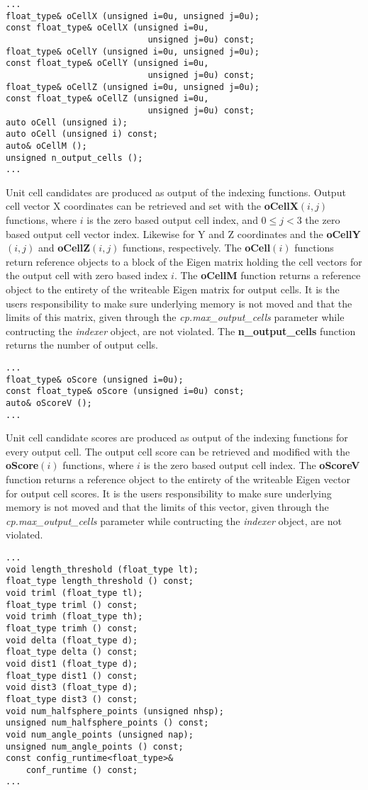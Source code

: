 \documentclass[a4paper,10pt]{article}
\begin{document}
%
\begin{lstlisting}
...
float_type& oCellX (unsigned i=0u, unsigned j=0u);
const float_type& oCellX (unsigned i=0u,
                            unsigned j=0u) const;
float_type& oCellY (unsigned i=0u, unsigned j=0u);
const float_type& oCellY (unsigned i=0u,
                            unsigned j=0u) const;
float_type& oCellZ (unsigned i=0u, unsigned j=0u);
const float_type& oCellZ (unsigned i=0u,
                            unsigned j=0u) const;
auto oCell (unsigned i);
auto oCell (unsigned i) const;
auto& oCellM ();
unsigned n_output_cells ();
...
\end{lstlisting}
%
Unit cell candidates are produced as output of the indexing functions. Output cell vector X coordinates can be retrieved and set with the \textbf{oCellX}$(i,j)$ functions, where $i$ is the zero based output cell index, and $0\leq j<3$ the zero based output cell vector index. Likewise for Y and Z coordinates and the \textbf{oCellY}$(i,j)$ and \textbf{oCellZ}$(i,j)$ functions, respectively. The \textbf{oCell}$(i)$ functions return reference objects to a block of the Eigen matrix holding the cell vectors for the output cell with zero based index $i$. The \textbf{oCellM} function returns a reference object to the entirety of the writeable Eigen matrix for output cells. It is the users responsibility to make sure underlying memory is not moved and that the limits of this matrix, given through the \emph{cp.max\_output\_cells} parameter while contructing the \emph{indexer} object, are not violated. The \textbf{n\_output\_cells} function returns the number of output cells.
%
\begin{lstlisting}
...
float_type& oScore (unsigned i=0u);
const float_type& oScore (unsigned i=0u) const;
auto& oScoreV ();
...
\end{lstlisting}
%
Unit cell candidate scores are produced as output of the indexing functions for every output cell. The output cell score can be retrieved and modified with the \textbf{oScore}$(i)$ functions, where $i$ is the zero based output cell index. The \textbf{oScoreV} function returns a reference object to the entirety of the writeable Eigen vector for output cell scores. It is the users responsibility to make sure underlying memory is not moved and that the limits of this vector, given through the \emph{cp.max\_output\_cells} parameter while contructing the \emph{indexer} object, are not violated.
%
\begin{lstlisting}
...
void length_threshold (float_type lt);
float_type length_threshold () const;
void triml (float_type tl);
float_type triml () const;
void trimh (float_type th);
float_type trimh () const;
void delta (float_type d);
float_type delta () const;
void dist1 (float_type d);
float_type dist1 () const;
void dist3 (float_type d);
float_type dist3 () const;
void num_halfsphere_points (unsigned nhsp);
unsigned num_halfsphere_points () const;
void num_angle_points (unsigned nap);
unsigned num_angle_points () const;
const config_runtime<float_type>&
    conf_runtime () const;
...
\end{lstlisting}
\end{document}
